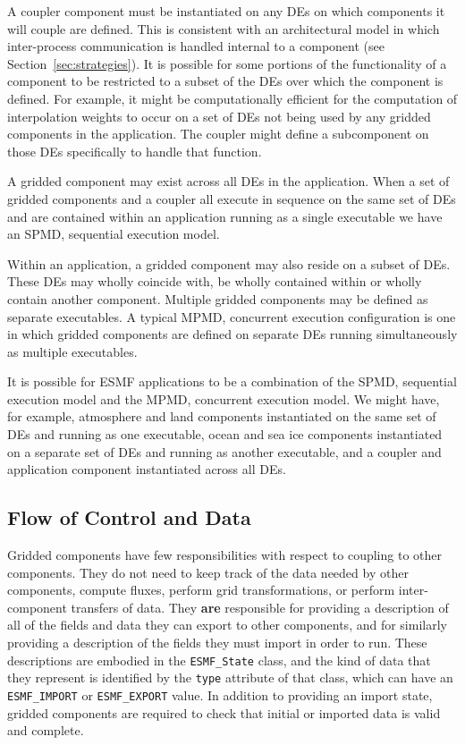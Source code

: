 A coupler component must be instantiated on any DEs on which components
it will couple are defined.  This is consistent with an architectural
model in which inter-process communication is handled internal to 
a component (see Section~\ref{sec:strategies}).  It is possible for
some portions of the functionality of a component to be restricted to
a subset of the DEs over which the component is defined.  For example, 
it might be computationally efficient for the computation of interpolation
weights to occur on a set of DEs not being used by any gridded components
in the application.  The coupler might define a subcomponent on those DEs 
specifically to handle that function.

A gridded component may exist across all DEs in the application.  When 
a set of gridded  components and a coupler all execute in sequence on 
the same set of DEs and are contained within an application running 
as a single executable we have an SPMD, sequential execution model.  

Within an application, a gridded component may also reside on 
a subset of DEs.  These DEs may wholly coincide with, be wholly 
contained within or wholly contain another component.  Multiple gridded 
components may be defined as separate executables.  A typical 
MPMD, concurrent execution configuration is one in which gridded components 
are defined on separate DEs running simultaneously as multiple 
executables.  

It is possible for ESMF applications to be a combination of the SPMD, 
sequential 
execution model and the MPMD, concurrent execution model.  We might have,
for example, atmosphere and land components instantiated on the same set of 
DEs and running as one executable, ocean and sea ice 
components instantiated on a separate set of DEs and running as 
another executable, and a coupler and application component 
instantiated across all DEs.

\subsection{Flow of Control and Data}

Gridded components have few responsibilities with respect to coupling
to other components.  They do not need to keep track of the data needed
by other components, compute fluxes, perform grid transformations, or 
perform inter-component transfers of data.  They {\bf are} responsible for 
providing a description of all of the fields and data they
can export to other components, and for similarly providing a description 
of the fields they must import in order to run.  These descriptions are
embodied in the {\tt ESMF\_State} class, and the kind of data that they 
represent is identified by the {\tt type} attribute of that class, which can
have an {\tt ESMF\_IMPORT} or {\tt ESMF\_EXPORT} value.  In addition to 
providing an import state, gridded components are required to check that 
initial or imported data is valid and complete.


